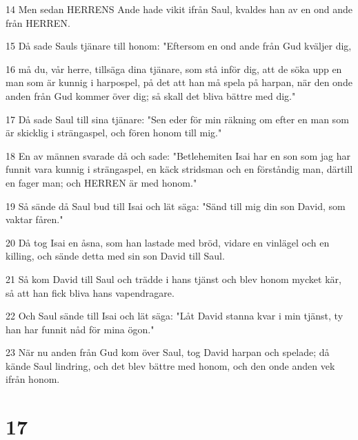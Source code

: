 \par 14 Men sedan HERRENS Ande hade vikit ifrån Saul, kvaldes han av en ond ande från HERREN.
\par 15 Då sade Sauls tjänare till honom: "Eftersom en ond ande från Gud kväljer dig,
\par 16 må du, vår herre, tillsäga dina tjänare, som stå inför dig, att de söka upp en man som är kunnig i harpospel, på det att han må spela på harpan, när den onde anden från Gud kommer över dig; så skall det bliva bättre med dig."
\par 17 Då sade Saul till sina tjänare: "Sen eder för min räkning om efter en man som är skicklig i strängaspel, och fören honom till mig."
\par 18 En av männen svarade då och sade: "Betlehemiten Isai har en son som jag har funnit vara kunnig i strängaspel, en käck stridsman och en förståndig man, därtill en fager man; och HERREN är med honom."
\par 19 Så sände då Saul bud till Isai och lät säga: "Sänd till mig din son David, som vaktar fåren."
\par 20 Då tog Isai en åsna, som han lastade med bröd, vidare en vinlägel och en killing, och sände detta med sin son David till Saul.
\par 21 Så kom David till Saul och trädde i hans tjänst och blev honom mycket kär, så att han fick bliva hans vapendragare.
\par 22 Och Saul sände till Isai och lät säga: "Låt David stanna kvar i min tjänst, ty han har funnit nåd för mina ögon."
\par 23 När nu anden från Gud kom över Saul, tog David harpan och spelade; då kände Saul lindring, och det blev bättre med honom, och den onde anden vek ifrån honom.

\chapter{17}

